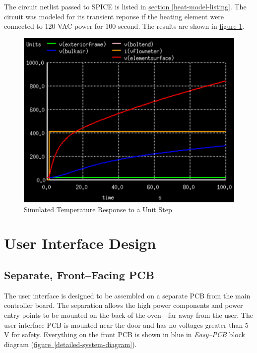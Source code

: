 \documentclass[10pt, twocolumn]{article}
\begin{document}
The circuit netlist passed to SPICE is listed in
\hyperref[heat-model-listing]{section \ref{heat-model-listing}}.
The circuit was modeled for its transient reponse if the heating element
were connected to 120 VAC power for 100 second.
The results are shown in
\hyperref[heat-model-results]{figure \ref{heat-model-results}}.

\begin{figure}
	\centering
	\includegraphics[width=1\columnwidth]{Figures/heat-model-results.pdf}
	\caption{Simulated Temperature Response to a Unit Step}
	\label{heat-model-results}
\end{figure}

\section{User Interface Design}

\subsection{Separate, Front--Facing PCB}

The user interface is designed to be assembled on a separate PCB
from the main controller board. The separation allows the high power
components and power entry points to be mounted on the back of the
oven---far away from the user.
The user interface PCB is mounted near the door and has no
voltages greater than 5 V for safety. Everything on the front PCB
is shown in blue in \emph{Easy--PCB} block diagram
\mbox{(\hyperref[detailed-system-diagram]{figure \ref{detailed-system-diagram}})}.
\end{document}
